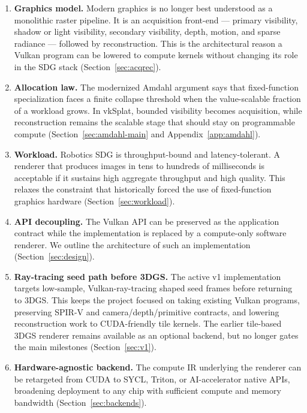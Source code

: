 \documentclass[10pt,journal]{IEEEtran}
\begin{document}
\begin{enumerate}
    \item \textbf{Graphics model.} Modern graphics is no longer best
    understood as a monolithic raster pipeline. It is an acquisition
    front-end --- primary visibility, shadow or light visibility,
    secondary visibility, depth, motion, and sparse radiance --- followed
    by reconstruction. This is the architectural reason a Vulkan program
    can be lowered to compute kernels without changing its role in the
    SDG stack (Section~\ref{sec:acqrec}).

    \item \textbf{Allocation law.} The modernized Amdahl argument says
    that fixed-function specialization faces a finite collapse threshold
    when the value-scalable fraction of a workload grows. In vkSplat,
    bounded visibility becomes acquisition, while reconstruction remains
    the scalable stage that should stay on programmable compute
    (Section~\ref{sec:amdahl-main} and Appendix~\ref{app:amdahl}).

    \item \textbf{Workload.} Robotics SDG is throughput-bound and
    latency-tolerant. A renderer that produces images in tens to hundreds
    of milliseconds is acceptable if it sustains high aggregate throughput
    and high quality. This relaxes the constraint that historically
    forced the use of fixed-function graphics hardware
    (Section~\ref{sec:workload}).

    \item \textbf{API decoupling.} The Vulkan API can be preserved as the
    application contract while the implementation is replaced by a
    compute-only software renderer. We outline the architecture of such
    an implementation (Section~\ref{sec:design}).

    \item \textbf{Ray-tracing seed path before 3DGS.}
    The active v1 implementation targets low-sample, Vulkan-ray-tracing
    shaped seed frames before returning to 3DGS. This keeps the project
    focused on taking existing Vulkan programs, preserving SPIR-V and
    camera/depth/primitive contracts, and lowering reconstruction work
    to CUDA-friendly tile kernels. The earlier tile-based 3DGS renderer
    remains available as an optional backend, but no longer gates the
    main milestones (Section~\ref{sec:v1}).

    \item \textbf{Hardware-agnostic backend.} The compute IR underlying
    the renderer can be retargeted from CUDA to SYCL, Triton, or
    AI-accelerator native APIs, broadening deployment to any chip with
    sufficient compute and memory bandwidth (Section~\ref{sec:backends}).
\end{enumerate}
\end{document}
